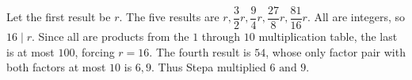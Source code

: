 Let the first result be $r$. The five results are $r,\dfrac{3}{2}r,\dfrac{9}{4}r,\dfrac{27}{8}r,\dfrac{81}{16}r$. All are integers, so $16\mid r$. Since all are products from the $1$ through $10$ multiplication table, the last is at most $100$, forcing $r=16$. The fourth result is $54$, whose only factor pair with both factors at most $10$ is $6,9$. Thus Stepa multiplied $\boxed6\text{ and }\boxed9$.
